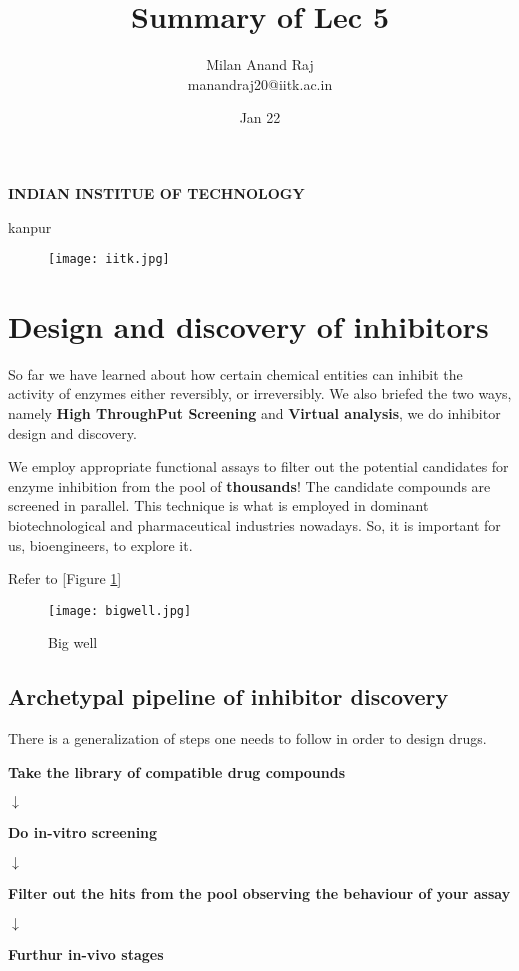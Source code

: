 \documentclass[12pt]{article}
\title{Summary of Lec 5}
\author{Milan Anand Raj\\manandraj20@iitk.ac.in}
\date{Jan 22}
\begin{document}
\NoBgThispage
\maketitle



\begin{center}
\textbf{INDIAN INSTITUE OF TECHNOLOGY}

kanpur
\end{center}


\vfill
\begin{figure}
\centering
\texttt{[image: iitk.jpg]}
\end{figure}
\clearpage
\tableofcontents
\clearpage
\NoBgThispage
\section{Design and discovery of inhibitors}
So far we have learned about how certain chemical entities can inhibit the activity of enzymes either reversibly, or irreversibly. We also briefed the two ways, namely \textbf{High ThroughPut Screening} and \textbf{Virtual analysis}, we do inhibitor design and discovery.

We employ appropriate functional assays to filter out the potential candidates for enzyme inhibition from the pool of \textbf{thousands}! The candidate compounds are screened in parallel. This technique is what is employed in dominant biotechnological and pharmaceutical industries nowadays. So, it is important for us, bioengineers, to explore it. 

Refer to [Figure \ref{fig bigwell}]
\begin{figure}[h]
\centering
\texttt{[image: bigwell.jpg]}
\caption{Big well}
\label{fig bigwell}
\end{figure}

\vfill

\subsection{Archetypal pipeline of inhibitor discovery  }
There is a generalization of steps one needs to follow in order to design drugs.
\begin{center}
\textbf{Take the library of compatible drug compounds  }

$\downarrow$

\textbf{Do in-vitro screening}

$\downarrow$

\textbf{Filter out the hits from the pool observing the behaviour of your assay}

$\downarrow$

\textbf{Furthur in-vivo stages}


\end{center}
\clearpage
\end{document}
